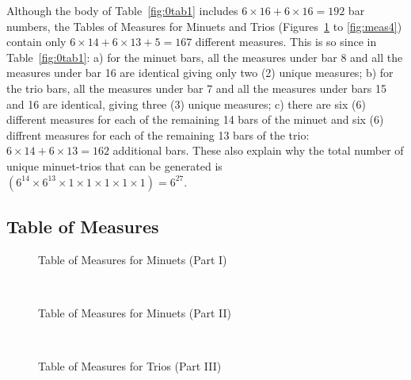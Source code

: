 \documentclass[a4paper,x11names,svgnames,10pt]{article}
\begin{document}
Although the body of Table~\ref{fig:0tab1} includes $6\times 16 + 6\times 16 = 192$ bar numbers, the Tables of Measures for Minuets and Trios (Figures~\ref{fig:meas1} to \ref{fig:meas4}) contain only $6\times 14 + 6\times 13 + 5 = 167$ different measures.  This is so since in Table~\ref{fig:0tab1}: a) for the minuet bars, all the measures under bar 8 and all the measures under bar 16 are identical giving only two (2) unique measures; b) for the trio bars, all the measures under bar 7 and all the measures under bars 15 and 16 are identical, giving three (3) unique measures; c) there are six (6) different measures for each of the remaining 14 bars of the minuet and six (6) diffrent measures for each of the remaining 13 bars of the trio: $6\times 14 + 6\times 13 = 162$ additional bars.  These also explain why the total number of unique minuet-trios that can be generated is $(6^{14}\times 6^{13}\times 1\times 1\times 1\times 1\times 1) = 6^{27}.$

\nopagebreak[4]
\subsection{Table of Measures}\label{tableMeas}

\begin{figure}[H]
	\centering
	\def\svgwidth{0.975\columnwidth}
	
	\caption{Table of Measures for Minuets (Part I)}
	\label{fig:meas1}
\end{figure}

\newpage
${}_{}$\\
\vspace{0.10in}
\begin{figure}[H]
	\centering
	\def\svgwidth{0.975\columnwidth}
	
	\caption{Table of Measures for Minuets (Part II)}
	\label{fig:meas2}
\end{figure}

\newpage
${}_{}$\\
\vspace{0.10in}
\begin{figure}[H]
	\centering
	\def\svgwidth{0.975\columnwidth}
	
	\caption{Table of Measures for Trios (Part III)}
	\label{fig:meas3}
\end{figure}
\end{document}
